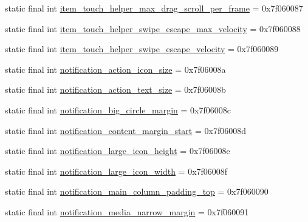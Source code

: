 \begin{DoxyCompactItemize}
\item 
static final int \mbox{\hyperlink{classandroid_1_1support_1_1v7_1_1recyclerview_1_1R_1_1dimen_a728dd54cdbb2064930d2fe9da462edeb}{item\+\_\+touch\+\_\+helper\+\_\+max\+\_\+drag\+\_\+scroll\+\_\+per\+\_\+frame}} = 0x7f060087
\item 
static final int \mbox{\hyperlink{classandroid_1_1support_1_1v7_1_1recyclerview_1_1R_1_1dimen_ac379d2745cb9cf4ae5ef9d2c4eecd7bc}{item\+\_\+touch\+\_\+helper\+\_\+swipe\+\_\+escape\+\_\+max\+\_\+velocity}} = 0x7f060088
\item 
static final int \mbox{\hyperlink{classandroid_1_1support_1_1v7_1_1recyclerview_1_1R_1_1dimen_a3921e54ecd29bea8852f97f3aedf5d4e}{item\+\_\+touch\+\_\+helper\+\_\+swipe\+\_\+escape\+\_\+velocity}} = 0x7f060089
\item 
static final int \mbox{\hyperlink{classandroid_1_1support_1_1v7_1_1recyclerview_1_1R_1_1dimen_afc1527a16a48922054f23e1694271a1d}{notification\+\_\+action\+\_\+icon\+\_\+size}} = 0x7f06008a
\item 
static final int \mbox{\hyperlink{classandroid_1_1support_1_1v7_1_1recyclerview_1_1R_1_1dimen_a1f6407e81bc3ef63d572333d7cdfd045}{notification\+\_\+action\+\_\+text\+\_\+size}} = 0x7f06008b
\item 
static final int \mbox{\hyperlink{classandroid_1_1support_1_1v7_1_1recyclerview_1_1R_1_1dimen_ad66ffce85781b53d0cbd7ec256d993a2}{notification\+\_\+big\+\_\+circle\+\_\+margin}} = 0x7f06008c
\item 
static final int \mbox{\hyperlink{classandroid_1_1support_1_1v7_1_1recyclerview_1_1R_1_1dimen_a57931a75a2932abe9b050285d641a184}{notification\+\_\+content\+\_\+margin\+\_\+start}} = 0x7f06008d
\item 
static final int \mbox{\hyperlink{classandroid_1_1support_1_1v7_1_1recyclerview_1_1R_1_1dimen_a990d167b178817607fd529af92c06629}{notification\+\_\+large\+\_\+icon\+\_\+height}} = 0x7f06008e
\item 
static final int \mbox{\hyperlink{classandroid_1_1support_1_1v7_1_1recyclerview_1_1R_1_1dimen_a20645c38e40951f47d501058cfb90835}{notification\+\_\+large\+\_\+icon\+\_\+width}} = 0x7f06008f
\item 
static final int \mbox{\hyperlink{classandroid_1_1support_1_1v7_1_1recyclerview_1_1R_1_1dimen_a9b1a7cf41560031012ea4255b1e2d6bf}{notification\+\_\+main\+\_\+column\+\_\+padding\+\_\+top}} = 0x7f060090
\item 
static final int \mbox{\hyperlink{classandroid_1_1support_1_1v7_1_1recyclerview_1_1R_1_1dimen_a2e265c18af5b779bdaaa7abcbc73d574}{notification\+\_\+media\+\_\+narrow\+\_\+margin}} = 0x7f060091

\end{DoxyCompactItemize}
